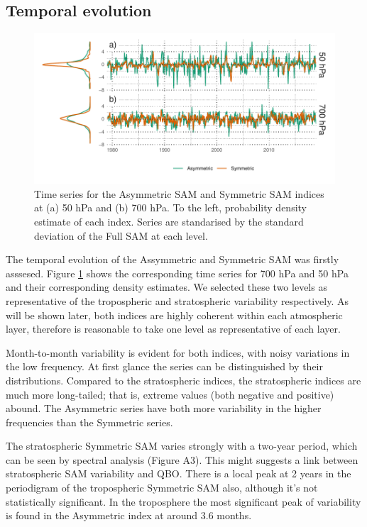 \documentclass[]{ametsocV5}
\begin{document}
\label{sec:results}

\subsection{Temporal evolution}

\label{sec:temporal}

\begin{figure}
\includegraphics{asymsam-timeseries-1} \caption[Time series for the Asymmetric SAM and Symmetric SAM indices at (a) 50 hPa and (b) 700 hPa]{Time series for the Asymmetric SAM and Symmetric SAM indices at (a) 50 hPa and (b) 700 hPa. To the left, probability density estimate of each index. Series are standarised by the standard deviation of the Full SAM at each level.}\label{fig:asymsam-timeseries}
\end{figure}

The temporal evolution of the Assymmetric and Symmetric SAM was firstly
asssesed. Figure \ref{fig:asymsam-timeseries} shows the corresponding
time series for 700 hPa and 50 hPa and their corresponding density
estimates. We selected these two levels as representative of the
tropospheric and stratospheric variability respectively. As will be
shown later, both indices are highly coherent within each atmospheric
layer, therefore is reasonable to take one level as representative of
each layer.

Month-to-month variability is evident for both indices, with noisy
variations in the low frequency. At first glance the series can be
distinguished by their distributions. Compared to the stratospheric
indices, the stratospheric indices are much more long-tailed; that is,
extreme values (both negative and positive) abound. The Asymmetric
series have both more variability in the higher frequencies than the
Symmetric series.

The stratospheric Symmetric SAM varies strongly with a two-year period,
which can be seen by spectral analysis (Figure A3). This might suggests
a link between stratospheric SAM variability and QBO. There is a local
peak at 2 years in the periodigram of the tropospheric Symmetric SAM
also, although it's not statistically significant. In the troposphere
the most significant peak of variability is found in the Asymmetric
index at around 3.6 months.
\end{document}

